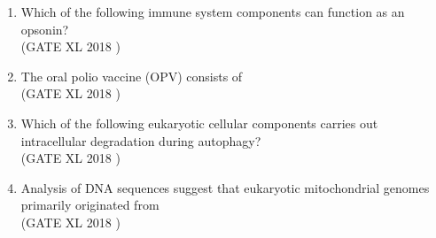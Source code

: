 \documentclass[14pt]{extarticle}
\begin{document}
\begin{flushleft}
\begin{enumerate}
\item Which of the following immune system components can function as an opsonin?\\
\hfill(GATE XL 2018 )\\
\begin{enumerate}[label=(\Alph*)]
\end{enumerate}

\item The oral polio vaccine (OPV) consists of\\
\hfill(GATE XL 2018 )\\
\begin{enumerate}[label=(\Alph*)]
\end{enumerate}

\item Which of the following eukaryotic cellular components carries out intracellular degradation during autophagy?\\
\hfill(GATE XL 2018 )\\
\begin{enumerate}[label=(\Alph*)]
\end{enumerate}

\item Analysis of DNA sequences suggest that eukaryotic mitochondrial genomes primarily originated from\\
\hfill(GATE XL 2018 )\\
\begin{enumerate}[label=(\Alph*)]
\end{enumerate}


\end{enumerate}
\end{flushleft}
\end{document}
